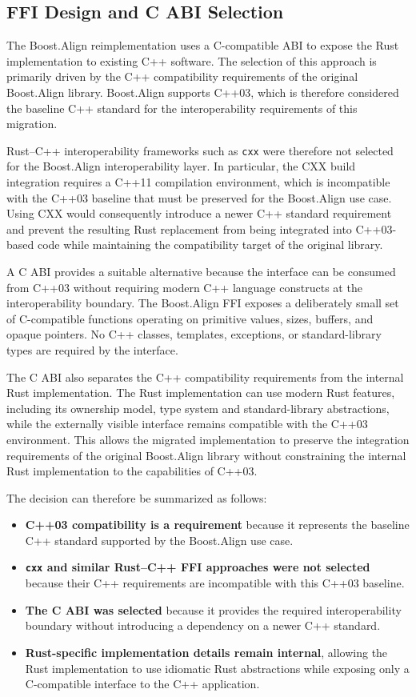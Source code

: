 \subsection{FFI Design and C ABI Selection}

The Boost.Align reimplementation uses a C-compatible ABI to expose the Rust implementation to existing C++ software. 
The selection of this approach is primarily driven by the C++ compatibility requirements of the original Boost.Align 
library. Boost.Align supports C++03, which is therefore considered the baseline C++ standard for 
the interoperability requirements of this migration.

Rust--C++ interoperability frameworks such as \texttt{cxx} were therefore not selected for the Boost.Align 
interoperability layer. In particular, the CXX build integration requires a C++11 compilation environment, 
which is incompatible with the C++03 baseline that must be preserved for the Boost.Align use case. 
Using CXX would consequently introduce a newer C++ standard requirement and prevent the resulting Rust replacement 
from being integrated into C++03-based code while maintaining the compatibility target of the original library.

A C ABI provides a suitable alternative because the interface can be consumed from C++03 without requiring modern 
C++ language constructs at the interoperability boundary. The Boost.Align FFI exposes a deliberately small set of 
C-compatible functions operating on primitive values, sizes, buffers, and opaque pointers. 
No C++ classes, templates, exceptions, or standard-library types are required by the interface.

The C ABI also separates the C++ compatibility requirements from the internal Rust implementation. 
The Rust implementation can use modern Rust features, including its ownership model, type system and standard-library 
abstractions, while the externally visible interface remains compatible with the C++03 environment. 
This allows the migrated implementation to preserve the integration requirements of the original Boost.Align library 
without constraining the internal Rust implementation to the capabilities of C++03.

The decision can therefore be summarized as follows:

\begin{itemize}
\item \textbf{C++03 compatibility is a requirement} because it represents the baseline C++ standard supported by 
the Boost.Align use case.
\item \textbf{\texttt{cxx} and similar Rust--C++ FFI approaches were not selected} because their C++ requirements are 
incompatible with this C++03 baseline.
\item \textbf{The C ABI was selected} because it provides the required interoperability boundary without introducing 
a dependency on a newer C++ standard.
\item \textbf{Rust-specific implementation details remain internal}, allowing the Rust implementation to use idiomatic 
Rust abstractions while exposing only a C-compatible interface to the C++ application.
\end{itemize}

